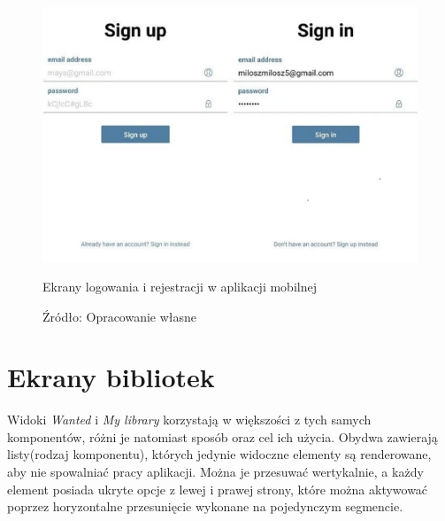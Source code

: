 \begin{figure}[H]
	\centering
	\includegraphics[width=\linewidth]{signin_signup.pdf}
	\caption{\centering Ekrany logowania i rejestracji w aplikacji mobilnej}
	\caption*{\centering Źródło: {Opracowanie własne}}
\end{figure}

\section{Ekrany bibliotek}
Widoki \textit{Wanted} i \textit{My library} korzystają w większości z tych samych komponentów, różni je natomiast sposób oraz cel ich użycia. Obydwa zawierają listy(rodzaj komponentu), których jedynie widoczne elementy są renderowane, aby nie spowalniać pracy aplikacji. Można je przesuwać wertykalnie, a każdy element posiada ukryte opcje z lewej i prawej strony, które można aktywować poprzez horyzontalne przesunięcie wykonane na pojedynczym segmencie.


